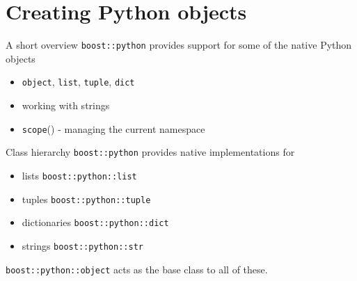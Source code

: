 
\newcommand{\pyobject}{\texttt{object}}
\newcommand{\pylist}{\texttt{list}}
\newcommand{\pytuple}{\texttt{tuple}}
\newcommand{\pydict}{\texttt{dict}}
\newcommand{\pystr}{\texttt{str}}
\newcommand{\pyscope}{\texttt{scope}}
\newcommand{\bpyobject}{\texttt{boost::python::object}}
\newcommand{\bpylist}{\texttt{boost::python::list}}
\newcommand{\bpytuple}{\texttt{boost::python::tuple}}
\newcommand{\bpydict}{\texttt{boost::python::dict}}
\newcommand{\bpystr}{\texttt{boost::python::str}}
\newcommand{\bpyscope}{\texttt{boost::python::scope}}

\section{Creating Python objects}
\begin{frame}{A short overview}
    \texttt{boost::python} provides support for some of the native 
    Python objects
    \vspace{0.1\textheight}
    \begin{itemize}
        \setlength{\itemsep}{0.05\textheight}
        \item \pyobject, \pylist, \pytuple, \pydict
        \item working with strings
        \item \pyscope() - managing the current namespace
    \end{itemize}
\end{frame}

\begin{frame}[fragile]{Class hierarchy}
    \texttt{boost::python} provides native implementations for 
    \begin{itemize}
        \item lists \bpylist
        \item tuples \bpytuple
        \item dictionaries \bpydict
        \item strings \bpystr
    \end{itemize}
    \vspace{0.025\textheight}
    \begin{center}
        
    \end{center}
    \vspace{0.025\textheight}
    \texttt{boost::python::object} acts as the base class to all of these.
\end{frame}

